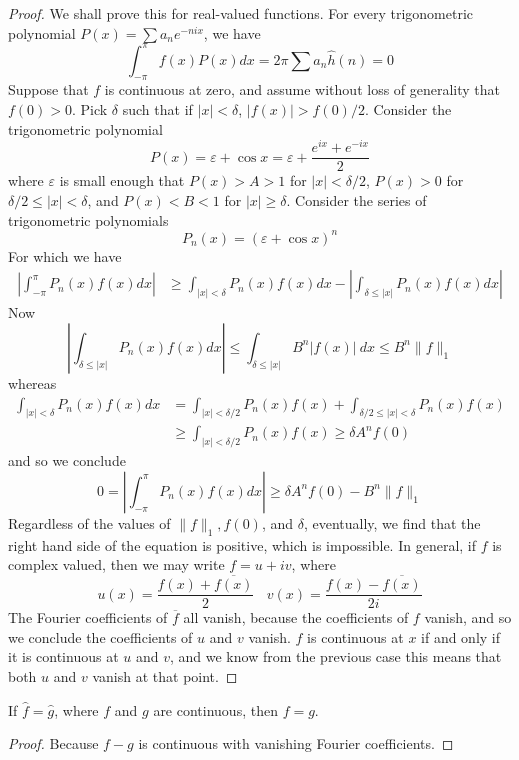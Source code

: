 \begin{proof}
    We shall prove this for real-valued functions. For every trigonometric polynomial $P(x) = \sum a_n e^{-nix}$, we have
    \[ \int_{-\pi}^\pi f(x) P(x) dx = 2 \pi \sum a_n \widehat{h}(n) = 0 \]
    Suppose that $f$ is continuous at zero, and assume without loss of generality that $f(0) > 0$. Pick $\delta$ such that if $|x| < \delta$, $|f(x)| > f(0)/2$. Consider the trigonometric polynomial
    \[ P(x) = \varepsilon + \cos x = \varepsilon + \frac{e^{ix} + e^{-ix}}{2} \]
    where $\varepsilon$ is small enough that $P(x) > A > 1$ for $|x| < \delta/2$, $P(x) > 0$ for $\delta/2 \leq |x| < \delta$, and $P(x) < B < 1$ for $|x| \geq \delta$. Consider the series of trigonometric polynomials
    \[ P_n(x) = (\varepsilon + \cos x)^n \]
    For which we have
    \begin{align*}
        \left| \int_{-\pi}^\pi P_n(x) f(x) dx \right| &\geq \int_{|x| < \delta} P_n(x) f(x) dx - \left| \int_{\delta \leq |x|} P_n(x) f(x) dx \right|
    \end{align*}
    Now
    \[ \left| \int_{\delta \leq |x|} P_n(x) f(x) dx \right| \leq \int_{\delta \leq |x|} B^n |f(x)|\ dx \leq B^n \| f \|_1 \]
    whereas
    \begin{align*}
        \int_{|x| < \delta} P_n(x) f(x) dx &= \int_{|x| < \delta/2} P_n(x) f(x) + \int_{\delta/2 \leq |x| < \delta} P_n(x) f(x)\\
        &\geq \int_{|x| < \delta/2} P_n(x) f(x) \geq \delta A^n f(0)
    \end{align*}
    and so we conclude
    \[ 0 = \left| \int_{-\pi}^\pi P_n(x) f(x) dx \right| \geq \delta A^n f(0) - B^n \| f \|_1 \]
    Regardless of the values of $\| f \|_1, f(0)$, and $\delta$, eventually, we find that the right hand side of the equation is positive, which is impossible. In general, if $f$ is complex valued, then we may write $f = u + iv$, where
    \[ u(x) = \frac{f(x) + \overline{f(x)}}{2}\ \ \ \ v(x) = \frac{f(x) - \overline{f(x)}}{2i} \]
    The Fourier coefficients of $\overline{f}$ all vanish, because the coefficients of $f$ vanish, and so we conclude the coefficients of $u$ and $v$ vanish. $f$ is continuous at $x$ if and only if it is continuous at $u$ and $v$, and we know from the previous case this means that both $u$ and $v$ vanish at that point.
\end{proof}

\begin{corollary}
    If $\widehat{f} = \widehat{g}$, where $f$ and $g$ are continuous, then $f = g$.
\end{corollary}
\begin{proof}
    Because $f - g$ is continuous with vanishing Fourier coefficients.
\end{proof}

